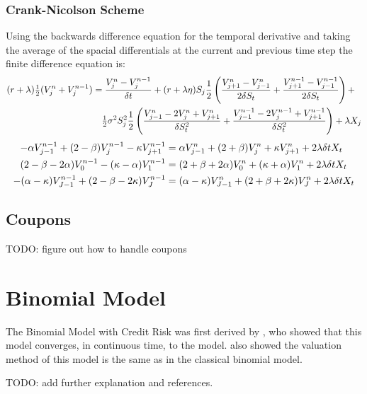 \documentclass[a4paper,11pt,oneside]{report}
\theoremstyle{plain}
\theoremstyle{definition}
\begin{document}
\subsection{Crank-Nicolson Scheme}
Using the backwards difference equation for the temporal derivative and taking the average of the spacial differentials at the current and previous time step the finite difference equation is:
\small\begin{align*}
 (r + \lambda)\tfrac{1}{2}(V^{n}_j + V^{n - 1}_j) &= \frac{V^{n}_j - V^{n - 1}_j}{\delta t} + (r + \lambda\eta)S_j\frac{1}{2}\left(\frac{V^{n}_{j + 1} - V^{n}_{j - 1}}{2\delta S_t} + \frac{V^{n - 1}_{j + 1} - V^{n - 1}_{j - 1}}{2\delta S_t}\right) + \\
  &\quad \tfrac{1}{2}\sigma^2S_j^2\frac{1}{2}\left(\frac{V^{n}_{j - 1} - 2V^{n}_j + V^{n}_{j + 1}}{\delta S_t^2} + \frac{V^{n - 1}_{j - 1} - 2V^{n - 1}_j + V^{n - 1}_{j + 1}}{\delta S_t^2}\right) + \lambda X_j
\end{align*}
\begin{align}
 -\alpha V^{n - 1}_{j - 1} + (2 - \beta)V^{n - 1}_j - \kappa V^{n - 1}_{j + 1} &= \alpha V^{n}_{j - 1} + (2 + \beta)V^{n}_j + \kappa V^{n}_{j + 1} + 2\lambda\delta tX_t \\
 (2 - \beta - 2\alpha)V^{n - 1}_{0} - (\kappa - \alpha)V^{n - 1}_{1} &= (2 + \beta + 2\alpha)V^{n}_{0} + (\kappa + \alpha)V^{n}_{1} + 2\lambda\delta tX_t \\
 -(\alpha - \kappa)V^{n - 1}_{J - 1} + (2 - \beta - 2\kappa)V^{n - 1}_{J} &= (\alpha - \kappa)V^{n}_{J - 1} + (2 + \beta + 2\kappa)V^{n}_{J} + 2\lambda\delta tX_t
\end{align}\normalsize


\section{Coupons}
TODO: figure out how to handle coupons


\chapter{Binomial Model}
The Binomial Model with Credit Risk was first derived by \citet{MK12}, who showed that this model converges, in continuous time, to the \citet{AFV03} model.   also showed the valuation method of this model is the same as in the classical binomial model.

TODO: add further explanation and references.

\end{document}
